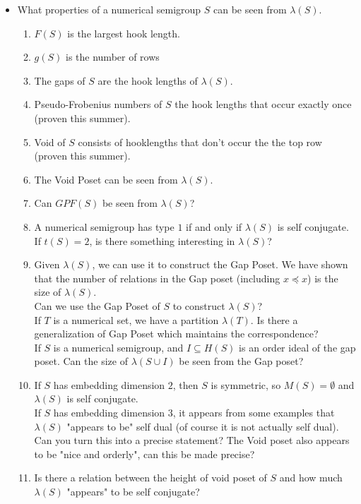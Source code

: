 \documentclass{article}
\theoremstyle{definition}
\theoremstyle{definition}
\theoremstyle{definition}
\begin{document}
\begin{itemize}
    \item What properties of a numerical semigroup $S$ can be seen from $\lambda(S)$.
\begin{enumerate}
    \item $F(S)$ is the largest hook length.
    \item $g(S)$ is the number of rows
    \item The gaps of $S$ are the hook lengths of $\lambda(S)$.
    \item Pseudo-Frobenius numbers of $S$ the hook lengths that occur exactly once (proven this summer).
    \item Void of $S$ consists of hooklengths that don't occur the the top row (proven this summer).
    \item The Void Poset can be seen from $\lambda(S)$.
    \item Can $GPF(S)$ be seen from $\lambda(S)$?
    \item A numerical semigroup has type $1$ if and only if $\lambda(S)$ is self conjugate.
    If $t(S)=2$, is there something interesting in $\lambda(S)$?
    \item Given $\lambda(S)$, we can use it to construct the Gap Poset. We have shown that the number of relations in the Gap poset (including $x\preccurlyeq x$) is the size of $\lambda(S)$.\\
    Can we use the Gap Poset of $S$ to construct $\lambda(S)$?\\
    If $T$ is a numerical set, we have a partition $\lambda(T)$. Is there a generalization of Gap Poset which maintains the correspondence?\\
    If $S$ is a numerical semigroup, and $I\subseteq H(S)$ is an order ideal of the gap poset. Can the size of $\lambda(S\cup I)$ be seen from the Gap poset?
    \item If $S$ has embedding dimension $2$, then $S$ is symmetric, so $M(S)=\emptyset$ and $\lambda(S)$ is self conjugate.\\
    If $S$ has embedding dimension $3$, it appears from some examples that $\lambda(S)$ "appears to be" self dual (of course it is not actually self dual). Can you turn this into a precise statement? The Void poset also appears to be "nice and orderly", can this be made precise?
    \item Is there a relation between the height of void poset of $S$ and how much $\lambda(S)$ "appears" to be self conjugate?
\end{enumerate}
\end{itemize}
\end{document}
